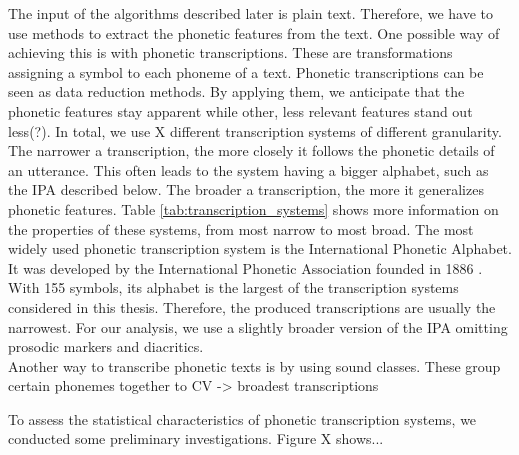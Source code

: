 






The input of the algorithms described later is plain text.
Therefore, we have to use methods to extract the phonetic features from the text.
One possible way of achieving this is with phonetic transcriptions.
These are transformations assigning a symbol to each phoneme of a text.
Phonetic transcriptions can be seen as data reduction methods.
By applying them, we anticipate that the phonetic features stay apparent while other, less relevant features stand out less(?).
In total, we use X different transcription systems of different granularity.
The narrower a transcription, the more closely it follows the phonetic details of an utterance.
This often leads to the system having a bigger alphabet, such as the IPA described below.
The broader a transcription, the more it generalizes phonetic features.
Table \ref{tab:transcription_systems} shows more information on the properties of these systems, from most narrow to most broad.
The most widely used phonetic transcription system is the International Phonetic Alphabet. %
It was developed by the International Phonetic Association founded in 1886 \cite{ipa1999ipaHandbook}.
With 155 symbols, its alphabet is the largest of the transcription systems considered in this thesis.
Therefore, the produced transcriptions are usually the narrowest.
For our analysis, we use a slightly broader version of the IPA omitting prosodic markers and diacritics.\\ %

Another way to transcribe phonetic texts is by using sound classes.
These group certain phonemes together to
CV -> broadest transcriptions




To assess the statistical characteristics of phonetic transcription systems, we conducted some preliminary investigations.
Figure X shows...

